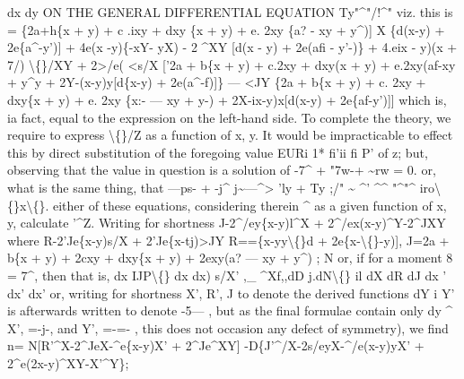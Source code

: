 \documentclass[12pt,a4paper]{article}
\begin{document}
dx
dy
ON THE GENERAL DIFFERENTIAL EQUATION Ty"\textasciicircum{}"/!\textasciicircum{}"
viz.
this
is
= \{2a+h\{x + y) + c .ixy + dxy \{x + y) + e. 2xy \{a? - xy + y\textasciicircum{})]
X \{d(x-y) + 2e\{a\textasciicircum{}-y')] + 4e(x -y)\{-xY- yX)
- 2 \textasciicircum{}XY [d(x - y) + 2e(afi - y'-)\} + 4.eix - y)(x + 7/) \textbackslash\{\}/XY
+ 2>/e(
<s/X ['2a + b\{x + y) + c.2xy + dxy(x + y) + e.2xy(af-xy + y\textasciicircum{}y
+ 2Y-(x-y)y[d\{x-y) + 2e(a\textasciicircum{}-f)]\}
--- <JY \{2a + b\{x + y) + c. 2xy + dxy\{x + y) + e. 2xy \{x:- --- xy + y-)
+ 2X-ix-y)x[d(x-y) + 2e\{af-y')]]
which
is,
ia
fact, equal to the expression on the
left-hand
side.
To
complete
the
theory,
we
require
to
express
\textbackslash\{\}/Z
as
a
function
of
x,
y.
It
would
be
impracticable
to
effect
this
by
direct
substitution
of
the
foregoing
value
EURi 1*
fi'ii
fi P'
of
z;
but,
observing
that
the
value
in
question
is
a
solution
of
-7\textasciicircum{} + "7w-+ \textasciitilde{}rw = 0.
or, what
is
the
same
thing, that
---ps- + -j\textasciicircum{} j\textasciitilde{}---\textasciicircum{}> 'ly + Ty ;/" \textasciitilde{} \textasciicircum{}'
\textasciicircum{}\textasciicircum{}\textregistered{}
"\textasciicircum{}"\textasciicircum{}
iro\textbackslash\{\}x\textbackslash\{\}.
either
of
these equations, considering therein \textasciicircum{} as a given function of x,
y,
calculate
'\textasciicircum{}Z.
Writing
for shortness
J-2\textasciicircum{}/ey\{x-y)l\textasciicircum{}X + 2\textasciicircum{}/ex(x-y)\textasciicircum{}Y-2\textasciicircum{}JXY
where
R-2'Je\{x-y)s/X + 2'Je\{x-tj)>JY
R==\{x-yy\textbackslash\{\}d + 2e\{x-\textbackslash\{\}-y)],
J=2a + b\{x + y) + 2cxy + dxy\{x + y) + 2exy(a? --- xy + y\textasciicircum{})
;
N
or,
if for a moment
8 = 7\textasciicircum{}, then
that
is,
dx
IJP\textbackslash\{\}
dx
dx)
s/X'
,\_
\textasciicircum{}Xf,,dD
j.dN\textbackslash\{\}
il
dX
dR
dJ
dx
'
dx'
dx'
or,
writing
for
shortness
X',
R', J
to
denote
the
derived
functions
dY
i Y'
is
afterwards
written
to
denote
-5---
,
but
as
the
final
formulae
contain
only
dy
\textasciicircum{}
X', =-j-, and
Y', =-=-
,
this does not occasion any defect of symmetry), we
find
n=
N[R'\textasciicircum{}X-2\textasciicircum{}JeX-\textasciicircum{}e\{x-y)X' + 2\textasciicircum{}Je\textasciicircum{}XY]
-D\{J'\textasciicircum{}/X-2s/eyX-\textasciicircum{}/e(x-y)yX' + 2\textasciicircum{}e(2x-y)\textasciicircum{}XY-X'\textasciicircum{}Y\};
\end{document}
